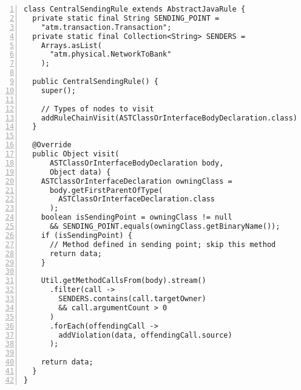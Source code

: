 \begin{lstlisting}[caption={Constraint 3.}, captionpos=b, label=lst:pmd_3, numbers=left, showstringspaces=false]
class CentralSendingRule extends AbstractJavaRule {
  private static final String SENDING_POINT =
    "atm.transaction.Transaction";
  private static final Collection<String> SENDERS =
    Arrays.asList(
      "atm.physical.NetworkToBank"
    );

  public CentralSendingRule() {
    super();

    // Types of nodes to visit
    addRuleChainVisit(ASTClassOrInterfaceBodyDeclaration.class);
  }

  @Override
  public Object visit(
      ASTClassOrInterfaceBodyDeclaration body,
      Object data) {
    ASTClassOrInterfaceDeclaration owningClass =
      body.getFirstParentOfType(
        ASTClassOrInterfaceDeclaration.class
      );
    boolean isSendingPoint = owningClass != null
      && SENDING_POINT.equals(owningClass.getBinaryName());
    if (isSendingPoint) {
      // Method defined in sending point; skip this method
      return data;
    }

    Util.getMethodCallsFrom(body).stream()
      .filter(call ->
        SENDERS.contains(call.targetOwner)
        && call.argumentCount > 0
      )
      .forEach(offendingCall -> 
        addViolation(data, offendingCall.source)
      );

    return data;
  }
}
\end{lstlisting}


